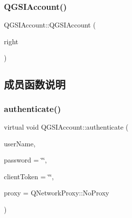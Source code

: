\mbox{\label{class_q_g_s_i_account_ae041bd606d553b3287db33c6a82f6188}} 
\subsubsection{\texorpdfstring{Q\+G\+S\+I\+Account()}{QGSIAccount()}\hspace{0.1cm}{\footnotesize\ttfamily [3/3]}}
{\footnotesize\ttfamily Q\+G\+S\+I\+Account\+::\+Q\+G\+S\+I\+Account (\begin{DoxyParamCaption}\item[{\mbox{\hyperlink{class_q_g_s_i_account}{Q\+G\+S\+I\+Account}} \&\&}]{right }\end{DoxyParamCaption})\hspace{0.3cm}{\ttfamily [default]}}



\subsection{成员函数说明}
\mbox{\label{class_q_g_s_i_account_ad10a95dcbe8f6071d63ecfdf60f40609}} 
\subsubsection{\texorpdfstring{authenticate()}{authenticate()}}
{\footnotesize\ttfamily virtual void Q\+G\+S\+I\+Account\+::authenticate (\begin{DoxyParamCaption}\item[{const Q\+String \&}]{user\+Name,  }\item[{const Q\+String \&}]{password = {\ttfamily \char`\"{}\char`\"{}},  }\item[{Q\+String}]{client\+Token = {\ttfamily \char`\"{}\char`\"{}},  }\item[{Q\+Network\+Proxy}]{proxy = {\ttfamily QNetworkProxy\+:\+:NoProxy} }\end{DoxyParamCaption})\hspace{0.3cm}{\ttfamily [pure virtual]}}



